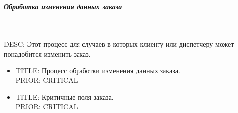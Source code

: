 \subparagraph{Обработка изменения данных заказа} \mbox{}\\ \label{change_order_processor} 

  DESC: Этот процесс для случаев в которых клиенту или диспетчеру может понадобится изменить заказ.

  \begin{itemize}

   \item {
      TITLE: Процесс обработки изменения данных заказа.
      \\
      PRIOR: CRITICAL\\
   }

   \item {
    TITLE: Критичные поля заказа.
     \\ 
      PRIOR: CRITICAL\\   
   }

   \end{itemize}


